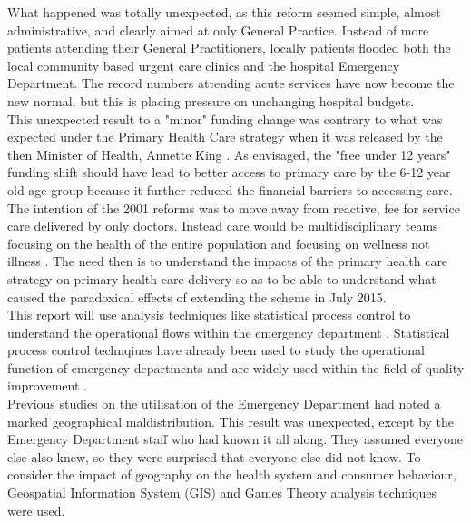 \documentclass[11pt,a4paper]{article}
\begin{document}
What happened was totally unexpected, as this reform seemed simple, almost administrative, and clearly aimed at only General Practice. Instead of more patients  attending their General Practitioners, locally patients flooded both the local community based urgent care clinics and the hospital Emergency Department. The record numbers attending acute services have now become the new normal, but this is placing pressure on unchanging hospital budgets. \\

This unexpected result to a "minor" funding change was contrary to what was expected under the Primary Health Care strategy when it was released by the then Minister of Health, Annette King \citep{king2001primary}. As envisaged, the "free under 12 years" funding shift should have lead to better access to primary care by the 6-12 year old age group because it further reduced the financial barriers to accessing care. The intention of the 2001 reforms was to move away from reactive, fee for service care delivered by only doctors. Instead care would be multidisciplinary teams focusing on the health of the entire population and focusing on wellness not illness \citep{king2001primary}.  The need then is to understand the impacts of the primary health care strategy on primary health care delivery so as to be able to understand what caused the paradoxical effects of extending the scheme in July 2015.\\

This report will use analysis techniques like statistical process control to understand the operational flows within the emergency department \citep{rosemann2015six, cheng2015run, epprecht2015statistical}. Statistical process control technqiues have already been used to study the operational function of emergency departments \citep{pimentel2015statistical} and are widely used within the field of quality improvement \citep{provost2011health}.\\

Previous studies on the utilisation of the Emergency Department had noted a marked geographical maldistribution. This result was unexpected, except by the Emergency Department staff who had known it all along. They assumed everyone else also knew, so they were surprised that everyone else did not know. To consider the impact of geography on the health system and consumer behaviour, Geospatial Information System (GIS) and Games Theory analysis techniques were used.\\
\end{document}
